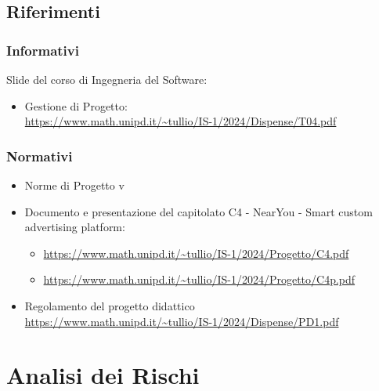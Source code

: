 \documentclass[12pt]{article}
\begin{document}
\subsection{Riferimenti}
\subsubsection{Informativi}
Slide del corso di Ingegneria del Software:
\begin{itemize}
    \item Gestione di Progetto:\\ \url{https://www.math.unipd.it/~tullio/IS-1/2024/Dispense/T04.pdf}
\end{itemize}

\subsubsection{Normativi}
\begin{itemize}
\item Norme di Progetto v
    \item Documento e presentazione del capitolato C4 - NearYou - Smart custom advertising platform:
    \begin{itemize}
        \item \url{https://www.math.unipd.it/~tullio/IS-1/2024/Progetto/C4.pdf}
        \item \url{https://www.math.unipd.it/~tullio/IS-1/2024/Progetto/C4p.pdf}
    \end{itemize}
    \item Regolamento del progetto didattico\\ \url{https://www.math.unipd.it/~tullio/IS-1/2024/Dispense/PD1.pdf}
\end{itemize}
\section{Analisi dei Rischi}
\end{document}

